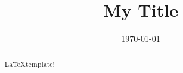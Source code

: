 \documentclass[11pt]{article}
\newcommand{\myname}{Lev Stambler}
\begin{document}
\title{My Title}


\date{\today}
\maketitle



\begin{abstract}
	\LaTeX template!
\end{abstract}



\end{document}
